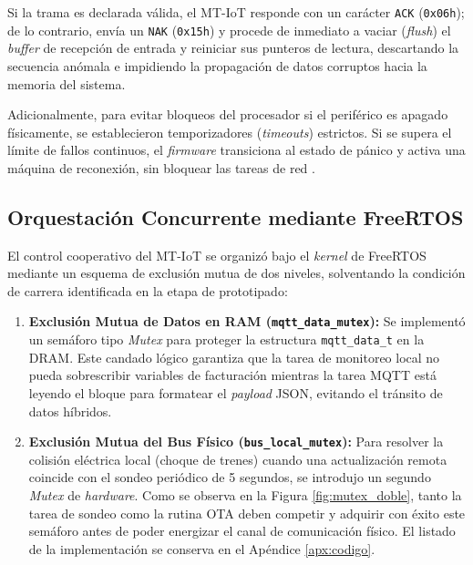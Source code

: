 \par Si la trama es declarada válida, el MT-IoT responde con un carácter \texttt{ACK} (\texttt{0x06h}); de lo contrario, envía un \texttt{NAK} (\texttt{0x15h}) y procede de inmediato a vaciar (\textit{flush}) el \textit{buffer} de recepción de entrada y reiniciar sus punteros de lectura, descartando la secuencia 
anómala e impidiendo la propagación de datos corruptos hacia la memoria del sistema.\\

\par Adicionalmente, para evitar bloqueos del procesador si el periférico es apagado físicamente, se establecieron temporizadores (\textit{timeouts}) estrictos. Si se supera el límite de fallos continuos, el \textit{firmware} transiciona al estado de pánico y activa una máquina de reconexión, sin bloquear las tareas de red \cite{FreeRTOS_Kernel_Ref}.

\subsection{Orquestación Concurrente mediante FreeRTOS}

\par El control cooperativo del MT-IoT se organizó bajo el \textit{kernel} de FreeRTOS mediante un esquema de exclusión mutua de dos niveles, solventando la condición de carrera identificada en la etapa de prototipado:

\begin{enumerate}
    \item \textbf{Exclusión Mutua de Datos en RAM (\texttt{mqtt\_data\_mutex}):} Se implementó un semáforo tipo \textit{Mutex} para proteger la estructura \texttt{mqtt\_data\_t} en la DRAM. Este candado lógico garantiza que la tarea de monitoreo local no pueda sobrescribir variables de facturación mientras la tarea MQTT está leyendo el bloque para formatear el \textit{payload} JSON, evitando el tránsito de datos híbridos.
    
    \item \textbf{Exclusión Mutua del Bus Físico (\texttt{bus\_local\_mutex}):} Para resolver la colisión eléctrica local (choque de trenes) cuando una actualización remota coincide con el sondeo periódico de 5 segundos, se introdujo un segundo \textit{Mutex} de \textit{hardware}. Como se observa en la Figura \ref{fig:mutex_doble}, tanto la tarea de sondeo como la rutina OTA deben competir y adquirir con éxito este semáforo antes de poder energizar el canal de comunicación físico. El listado de la implementación se conserva en el Apéndice \ref{apx:codigo}.
\end{enumerate}

